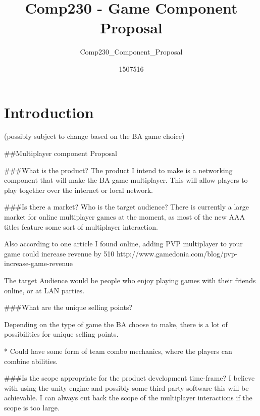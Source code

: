 \documentclass{scrartcl}
\title{Comp230 - Game Component Proposal}
\subtitle{Comp230_Component_Proposal}
\author{1507516}
\begin{document}
\maketitle

\abstract{}

\section{Introduction}
(possibly subject to change based on the BA game choice)

##Multiplayer component Proposal 

###What is the product?
The product I intend to make is a networking component that will make the BA game multiplayer.
This will allow players to play together over the internet or local network.

###Is there a market? Who is the target audience?
There is currently a large market for online multiplayer games at the moment, as most of the new AAA titles feature some sort of multiplayer interaction. 

Also according to one article I found online, adding PVP multiplayer to your game could increase revenue by 510%
http://www.gamedonia.com/blog/pvp-increase-game-revenue

The target Audience would be people who enjoy playing games with their friends online, or at LAN parties.

###What are the unique selling points?

Depending on the type of game the BA choose to make, there is a lot of possibilities for unique selling points.

* Could have some form of team combo mechanics, where the players can combine abilities.


###Is the scope appropriate for the product development time-frame?
I believe with using the unity engine and possibly some third-party software this will be achievable. I can always cut back the scope of the multiplayer interactions if the scope is too large. 




\end{document}
